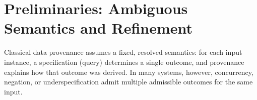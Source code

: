 \documentclass[acmsmall,nonacm]{acmart}
\theoremstyle{remark}
\numberwithin{definition}{section}
\numberwithin{theorem}{section}
\numberwithin{lemma}{section}
\numberwithin{corollary}{section}
\numberwithin{remark}{section}
\numberwithin{example}{section}
\numberwithin{observation}{section}
\numberwithin{assumption}{section}
\begin{document}





\section{Preliminaries: Ambiguous Semantics and Refinement}
\label{sec:prelim}

Classical data provenance assumes a fixed, resolved semantics: for each input instance,
a specification (query) determines a single outcome, and provenance explains how that outcome was
derived.
In many systems, however, concurrency, negation, or underspecification admit
multiple admissible outcomes for the same input.
\end{document}
